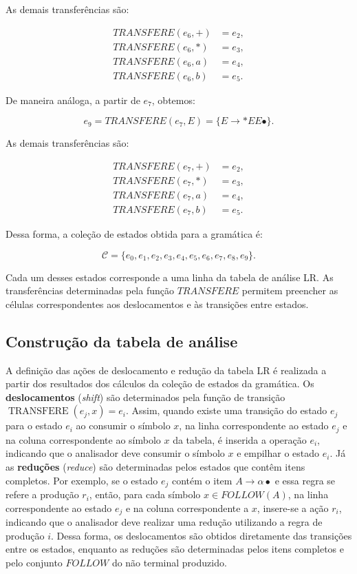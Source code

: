 \documentclass[
  brazilian,
  letterpaper,
]{book}
\theoremstyle{plain}
\theoremstyle{definition}
\theoremstyle{remark}
\begin{document}
As demais transferências são:

\[
\begin{aligned}
TRANSFERE(e_6,+)&=e_2,\\
TRANSFERE(e_6,*)&=e_3,\\
TRANSFERE(e_6,a)&=e_4,\\
TRANSFERE(e_6,b)&=e_5.
\end{aligned}
\]

De maneira análoga, a partir de \(e_7\), obtemos:

\[
e_9
=TRANSFERE(e_7,E)
=\{E\rightarrow*EE\bullet\}.
\]

As demais transferências são:

\[
\begin{aligned}
TRANSFERE(e_7,+)&=e_2,\\
TRANSFERE(e_7,*)&=e_3,\\
TRANSFERE(e_7,a)&=e_4,\\
TRANSFERE(e_7,b)&=e_5.
\end{aligned}
\]

Dessa forma, a coleção de estados obtida para a gramática é:

\[
\mathcal{C}=
\{e_0,e_1,e_2,e_3,e_4,e_5,e_6,e_7,e_8,e_9\}.
\]

Cada um desses estados corresponde a uma linha da tabela de análise LR.
As transferências determinadas pela função \(TRANSFERE\) permitem
preencher as células correspondentes aos deslocamentos e às transições
entre estados.

\subsection{Construção da tabela de
análise}\label{construuxe7uxe3o-da-tabela-de-anuxe1lise}

A definição das ações de deslocamento e redução da tabela LR é realizada
a partir dos resultados dos cálculos da coleção de estados da gramática.
Os \textbf{deslocamentos} (\emph{shift}) são determinados pela função de
transição \(\operatorname{TRANSFERE}(e_j,x)=e_i\). Assim, quando existe
uma transição do estado \(e_j\) para o estado \(e_i\) ao consumir o
símbolo \(x\), na linha correspondente ao estado \(e_j\) e na coluna
correspondente ao símbolo \(x\) da tabela, é inserida a operação
\(e_i\), indicando que o analisador deve consumir o símbolo \(x\) e
empilhar o estado \(e_i\). Já as \textbf{reduções} (\emph{reduce}) são
determinadas pelos estados que contêm itens completos. Por exemplo, se o
estado \(e_j\) contém o item \(A \rightarrow \alpha\bullet\) e essa
regra se refere a produção \(r_i\), então, para cada símbolo
\(x \in FOLLOW(A)\), na linha correspondente ao estado \(e_j\) e na
coluna correspondente a \(x\), insere-se a ação \(r_i\), indicando que o
analisador deve realizar uma redução utilizando a regra de produção
\(i\). Dessa forma, os deslocamentos são obtidos diretamente das
transições entre os estados, enquanto as reduções são determinadas pelos
itens completos e pelo conjunto \(FOLLOW\) do não terminal produzido.
\end{document}
